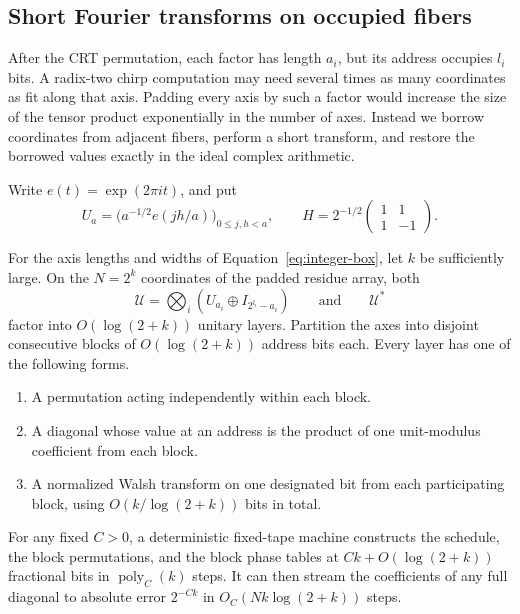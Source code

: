 \subsection{Short Fourier transforms on occupied fibers}

After the CRT permutation, each factor has length \(a_i\), but its
address occupies \(l_i\) bits. A radix-two chirp computation may need
several times as many coordinates as fit along that axis. Padding
every axis by such a factor would increase the size of the tensor
product exponentially in the number of axes. Instead we borrow
coordinates from adjacent fibers, perform a short transform, and
restore the borrowed values exactly in the ideal complex arithmetic.

Write \(e(t)=\exp(2\pi i t)\), and put
\[
 U_a=\bigl(a^{-1/2}e(jh/a)\bigr)_{0\le j,h<a},\qquad
 H=2^{-1/2}\begin{pmatrix}1&1\\1&-1\end{pmatrix}.
\]
\begin{lemma}\label{lem:synchronized-short}
For the axis lengths and widths of Equation~\eqref{eq:integer-box},
let \(k\) be sufficiently large. On the \(N=2^k\) coordinates of the
padded residue array, both
\[
             \mathcal U=\bigotimes_i(U_{a_i}\oplus I_{2^{l_i}-a_i})
             \qquad\text{and}\qquad \mathcal U^*
\]
factor into \(O(\log(2+k))\) unitary layers. Partition the axes into
disjoint consecutive blocks of \(O(\log(2+k))\) address bits each.
Every layer has one of the following forms.
\begin{enumerate}
\item A permutation acting independently within each block.
\item A diagonal whose value at an address is the product of one
      unit-modulus coefficient from each block.
\item A normalized Walsh transform on one designated bit from each
      participating block, using \(O(k/\log(2+k))\) bits in total.
\end{enumerate}
For any fixed \(C>0\), a deterministic fixed-tape machine constructs
the schedule, the block permutations, and the block phase tables
at \(Ck+O(\log(2+k))\) fractional bits in \(\operatorname{poly}_C(k)\)
steps. It can then stream the coefficients of any full diagonal to
absolute error \(2^{-Ck}\) in \(O_C(Nk\log(2+k))\) steps.
\end{lemma}

